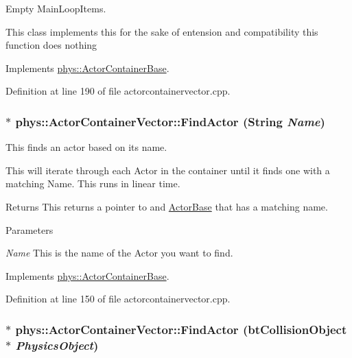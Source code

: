 Empty MainLoopItems. 

This class implements this for the sake of entension and compatibility this function does nothing 

Implements \hyperlink{classphys_1_1ActorContainerBase_a67fbde6a61602253f66fecd0416bdc2f}{phys::ActorContainerBase}.



Definition at line 190 of file actorcontainervector.cpp.

\hypertarget{classphys_1_1ActorContainerVector_ae04f8c6dd9b07ef9c1456707be9e155b}{
\subsubsection[{FindActor}]{ $\ast$ phys::ActorContainerVector::FindActor ({\bf String} {\em Name})}}
\label{d3/d64/classphys_1_1ActorContainerVector_ae04f8c6dd9b07ef9c1456707be9e155b}


This finds an actor based on its name. 

This will iterate through each Actor in the container until it finds one with a matching Name. This runs in linear time. \begin{DoxyReturn}{Returns}
This returns a pointer to and \hyperlink{classphys_1_1ActorBase}{ActorBase} that has a matching name. 
\end{DoxyReturn}

\begin{DoxyParams}{Parameters}
\item[{\em Name}]This is the name of the Actor you want to find. \end{DoxyParams}


Implements \hyperlink{classphys_1_1ActorContainerBase_a91223cbaebb8e5f11a4f971d7e5b64b6}{phys::ActorContainerBase}.



Definition at line 150 of file actorcontainervector.cpp.

\hypertarget{classphys_1_1ActorContainerVector_a5ebcdeb3018f3baf92154ddec79cd054}{
\subsubsection[{FindActor}]{ $\ast$ phys::ActorContainerVector::FindActor (btCollisionObject $\ast$ {\em PhysicsObject})}}
\label{d3/d64/classphys_1_1ActorContainerVector_a5ebcdeb3018f3baf92154ddec79cd054}


